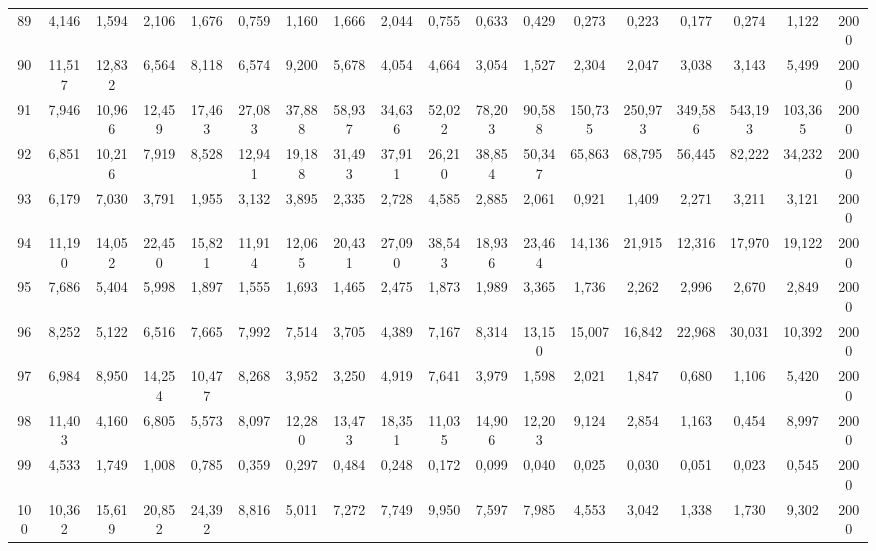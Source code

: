 {\begin{longtable}{ >{\tiny}cccccccccccccccccc}
89  & 4,146  & 1,594  & 2,106  & 1,676  & 0,759  & 1,160  & 1,666  & 2,044  & 0,755  & 0,633  & 0,429  & 0,273   & 0,223   & 0,177   & 0,274   & 1,122   & 2000 \\
90  & 11,517 & 12,832 & 6,564  & 8,118  & 6,574  & 9,200  & 5,678  & 4,054  & 4,664  & 3,054  & 1,527  & 2,304   & 2,047   & 3,038   & 3,143   & 5,499   & 2000 \\
91  & 7,946  & 10,966 & 12,459 & 17,463 & 27,083 & 37,888 & 58,937 & 34,636 & 52,022 & 78,203 & 90,588 & 150,735 & 250,973 & 349,586 & 543,193 & 103,365 & 2000 \\
92  & 6,851  & 10,216 & 7,919  & 8,528  & 12,941 & 19,188 & 31,493 & 37,911 & 26,210 & 38,854 & 50,347 & 65,863  & 68,795  & 56,445  & 82,222  & 34,232  & 2000 \\
93  & 6,179  & 7,030  & 3,791  & 1,955  & 3,132  & 3,895  & 2,335  & 2,728  & 4,585  & 2,885  & 2,061  & 0,921   & 1,409   & 2,271   & 3,211   & 3,121   & 2000 \\
94  & 11,190 & 14,052 & 22,450 & 15,821 & 11,914 & 12,065 & 20,431 & 27,090 & 38,543 & 18,936 & 23,464 & 14,136  & 21,915  & 12,316  & 17,970  & 19,122  & 2000 \\
95  & 7,686  & 5,404  & 5,998  & 1,897  & 1,555  & 1,693  & 1,465  & 2,475  & 1,873  & 1,989  & 3,365  & 1,736   & 2,262   & 2,996   & 2,670   & 2,849   & 2000 \\
96  & 8,252  & 5,122  & 6,516  & 7,665  & 7,992  & 7,514  & 3,705  & 4,389  & 7,167  & 8,314  & 13,150 & 15,007  & 16,842  & 22,968  & 30,031  & 10,392  & 2000 \\
97  & 6,984  & 8,950  & 14,254 & 10,477 & 8,268  & 3,952  & 3,250  & 4,919  & 7,641  & 3,979  & 1,598  & 2,021   & 1,847   & 0,680   & 1,106   & 5,420   & 2000 \\
98  & 11,403 & 4,160  & 6,805  & 5,573  & 8,097  & 12,280 & 13,473 & 18,351 & 11,035 & 14,906 & 12,203 & 9,124   & 2,854   & 1,163   & 0,454   & 8,997   & 2000 \\
99  & 4,533  & 1,749  & 1,008  & 0,785  & 0,359  & 0,297  & 0,484  & 0,248  & 0,172  & 0,099  & 0,040  & 0,025   & 0,030   & 0,051   & 0,023   & 0,545   & 2000 \\
100 & 10,362 & 15,619 & 20,852 & 24,392 & 8,816  & 5,011  & 7,272  & 7,749  & 9,950  & 7,597  & 7,985  & 4,553   & 3,042   & 1,338   & 1,730   & 9,302   & 2000 \\ \hline
\end{longtable}
}